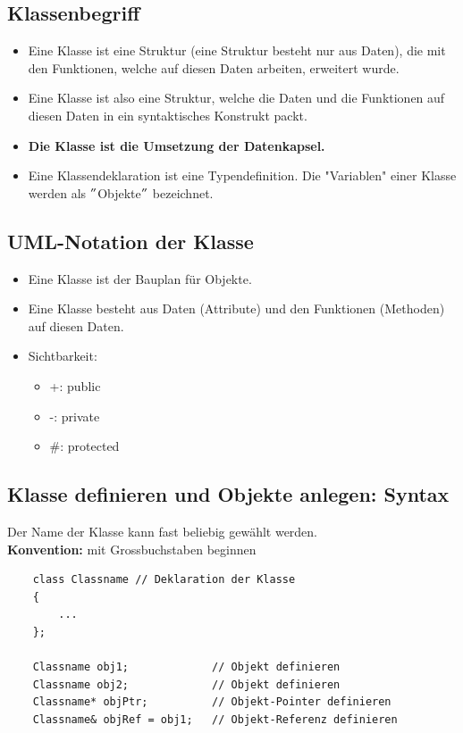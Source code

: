 \subsection{Klassenbegriff}
\begin{itemize}
	\item Eine Klasse ist eine Struktur (eine Struktur besteht nur aus Daten), die mit den Funktionen, welche auf diesen Daten arbeiten, erweitert wurde.
	\item Eine Klasse ist also eine Struktur, welche die Daten und die Funktionen auf diesen Daten in ein syntaktisches Konstrukt packt.
	\item \textbf{Die Klasse ist die Umsetzung der Datenkapsel.}
	\item Eine Klassendeklaration ist eine Typendefinition. Die "Variablen" einer Klasse werden als $"$Objekte$"$ bezeichnet.
\end{itemize}

\subsection{UML-Notation der Klasse}
\begin{itemize}
	\item Eine Klasse ist der Bauplan für Objekte.
	\item Eine Klasse besteht aus Daten (Attribute) und den Funktionen (Methoden) auf diesen Daten.
	\item Sichtbarkeit:
	\begin{itemize}
		\item[\-] +: public
		\item[\-] -: private
		\item[\-] \#: protected
	\end{itemize}
\end{itemize}

\subsection{Klasse definieren und Objekte anlegen: Syntax}
Der Name der Klasse kann fast beliebig gewählt werden.\\
\textbf{Konvention:} mit Grossbuchstaben beginnen
\noindent
\begin{minipage}{0.7\linewidth}
	\begin{lstlisting}
	class Classname	// Deklaration der Klasse
	{
		...
	};
	
	Classname obj1;				// Objekt definieren
	Classname obj2;				// Objekt definieren
	Classname* objPtr;			// Objekt-Pointer definieren
	Classname& objRef = obj1;	// Objekt-Referenz definieren
	\end{lstlisting}
\end{minipage}

